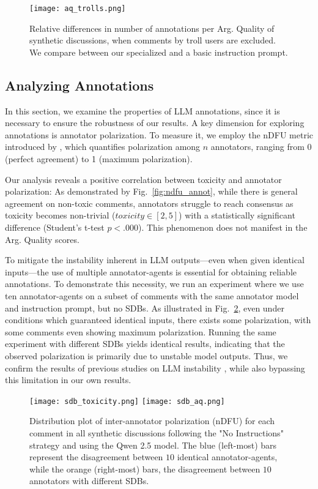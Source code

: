 \begin{figure}[t]
	\centering
	\texttt{[image: aq\_trolls.png]}
	\caption{Relative differences in number of annotations per Arg. Quality of synthetic discussions, when comments by troll users are excluded. We compare between our specialized and a basic instruction prompt.}
	\label{fig:aq_trolls}
\end{figure}


\subsection{Analyzing Annotations}

In this section, we examine the properties of LLM annotations, since it is necessary to ensure the robustness of our results. A key dimension for exploring annotations is annotator polarization. To measure it, we employ the nDFU metric introduced by \citet{pavlopoulos-likas-2024-polarized}, which quantifies polarization among $n$ annotators, ranging from 0 (perfect agreement) to 1 (maximum polarization).

Our analysis reveals a positive correlation between toxicity and annotator polarization: As demonstrated by Fig.~\ref{fig:ndfu_annot}, while there is general agreement on non-toxic comments, annotators struggle to reach consensus as toxicity becomes non-trivial ($\textit{toxicity} \in [2,5]$) with a statistically significant difference (Student's t-test $p < .000$). This phenomenon does not manifest in the Arg. Quality scores. 

To mitigate the instability inherent in LLM outputs—even when given identical inputs—the use of multiple annotator-agents is essential for obtaining reliable annotations. To demonstrate this necessity, we run an experiment where we use ten annotator-agents on a subset of comments with the same annotator model and instruction prompt, but no SDBs. As illustrated in Fig.~\ref{fig:sdb_annot}, even under conditions which guaranteed identical inputs, there exists some polarization, with some comments even showing maximum polarization. Running the same experiment with different SDBs yields identical results, indicating that the observed polarization is primarily due to unstable model outputs. Thus, we confirm the results of previous studies on LLM instability \cite{rossi_2024, atil_2025}, while also bypassing this limitation in our own results.


\begin{figure}[t]
	\texttt{[image: sdb\_toxicity.png]} \hfill
	\texttt{[image: sdb\_aq.png]}
	\centering
	\caption{Distribution plot of inter-annotator polarization (nDFU) for each comment in all synthetic discussions following the "No Instructions" strategy and using the Qwen 2.5 model. The blue (left-most) bars represent the disagreement between $10$ identical annotator-agents, while the orange (right-most) bars, the disagreement between $10$ annotators with different SDBs.}
	\label{fig:sdb_annot}
\end{figure}

